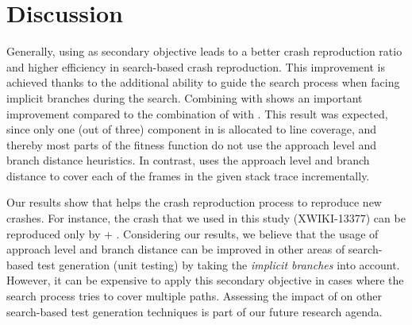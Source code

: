 \section{Discussion}
\label{sec:bbc:discussion}
Generally, using \bbc as secondary objective leads to a better crash reproduction ratio and higher efficiency in search-based crash reproduction. This improvement is achieved thanks to the additional ability to guide the search process when facing implicit branches during the search. 
Combining \bbc with \integ shows an important improvement compared to the combination of \bbc with \WS. This result was expected, since only one (out of three) component in \WS is allocated to line coverage, and thereby most parts of the fitness function do not use the approach level and branch distance heuristics. In contrast, \integ uses the approach level and branch distance to cover each of the frames in the given stack trace incrementally.

Our results show that \bbc helps the crash reproduction process to reproduce new crashes. For instance, the crash that we used in this study (XWIKI-13377) can be reproduced only by \integ + \bbc.
Considering our results, we believe that the usage of approach level and branch distance can be improved in other areas of search-based test generation (\eg unit testing) by taking the \textit{implicit branches} into account. However, it can be expensive to apply this secondary objective in cases where the search process tries to cover multiple paths. Assessing the impact of \bbc on other search-based test generation techniques is part of our future research agenda.


